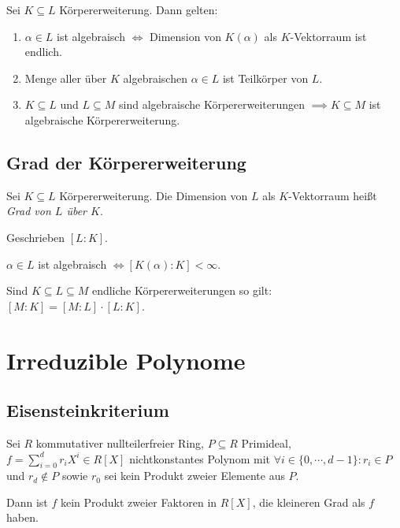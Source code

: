 Sei $K \subseteq L$ Körpererweiterung. Dann gelten:

\begin{enumerate}[label=(\alph*)]
	\item $\alpha \in L$ ist algebraisch $\iff$ Dimension von $K(\alpha)$ als $K$-Vektorraum ist endlich.
	\item Menge aller über $K$ algebraischen $\alpha \in L$ ist Teilkörper von $L$.
	\item $K \subseteq L$ und $L \subseteq M$ sind algebraische Körpererweiterungen $\implies K \subseteq M$ ist algebraische Körpererweiterung.
\end{enumerate}

\subsection*{Grad der Körpererweiterung}

Sei $K \subseteq L$ Körpererweiterung. Die Dimension von $L$ als $K$-Vektorraum heißt \emph{Grad von $L$ über $K$}.

Geschrieben $[L : K]$.

$\alpha \in L$ ist algebraisch $\iff [K(\alpha) : K] < \infty$.

\vspace*{1mm}

Sind $K \subseteq L \subseteq M$ endliche Körpererweiterungen so gilt: $[M : K] = [M : L] \cdot [L : K]$.

\section*{Irreduzible Polynome}

\subsection*{Eisensteinkriterium}

Sei $R$ kommutativer nullteilerfreier Ring, $P \subseteq R$ Primideal, $f = \sum_{i=0}^d r_i X^i \in R[X]$ nichtkonstantes Polynom mit $\forall i \in \{0,\cdots,d-1\} : r_i \in P$ und $r_d \notin P$ sowie $r_0$ sei kein Produkt zweier Elemente aus $P$.

\vspace*{1mm}

Dann ist $f$ kein Produkt zweier Faktoren in $R[X]$, die kleineren Grad als $f$ haben.

\vspace*{1mm}


